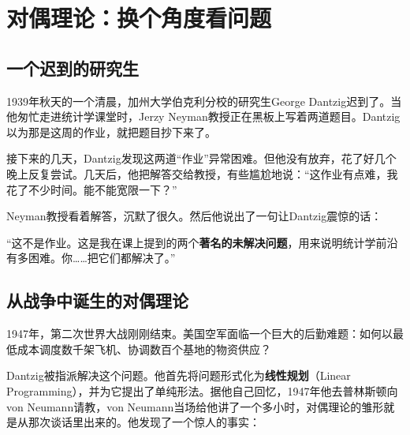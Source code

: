 \chapter{对偶理论：换个角度看问题}

\section*{一个迟到的研究生}


1939年秋天的一个清晨，加州大学伯克利分校的研究生George Dantzig迟到了。当他匆忙走进统计学课堂时，Jerzy Neyman教授正在黑板上写着两道题目。Dantzig以为那是这周的作业，就把题目抄下来了。

接下来的几天，Dantzig发现这两道“作业”异常困难。但他没有放弃，花了好几个晚上反复尝试。几天后，他把解答交给教授，有些尴尬地说：“这作业有点难，我花了不少时间。能不能宽限一下？”

Neyman教授看着解答，沉默了很久。然后他说出了一句让Dantzig震惊的话：

“这不是作业。这是我在课上提到的两个\textbf{著名的未解决问题}，用来说明统计学前沿有多困难。你……把它们都解决了。”

\section*{从战争中诞生的对偶理论}

1947年，第二次世界大战刚刚结束。美国空军面临一个巨大的后勤难题：如何以最低成本调度数千架飞机、协调数百个基地的物资供应？

Dantzig被指派解决这个问题。他首先将问题形式化为\textbf{线性规划}（Linear Programming），并为它提出了单纯形法。据他自己回忆，1947年他去普林斯顿向von Neumann请教，von Neumann当场给他讲了一个多小时，对偶理论的雏形就是从那次谈话里出来的。他发现了一个惊人的事实：

\begin{center}
\end{center}


